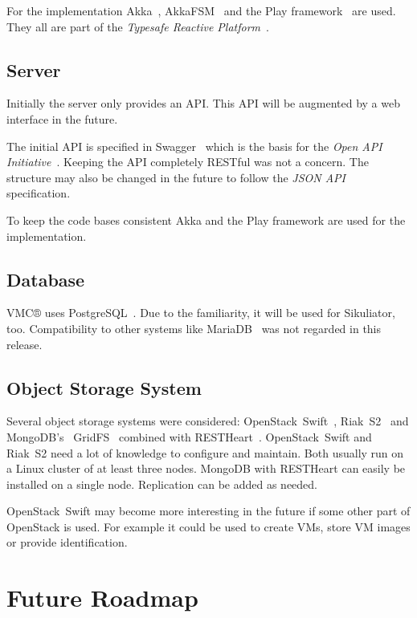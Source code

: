 \documentclass[a4paper,twocolumn]{article}
\newcommand{\VMC}[0]{VMC®}
\newcommand{\Sik}[0]{Sikuliator}
\begin{document}
For the implementation Akka~\cite{Akka}, AkkaFSM~\cite{AkkaFSM} and the Play framework~\cite{Play} are used.
They all are part of the \emph{Typesafe Reactive Platform}~\cite{TypesafeRP}.

\subsection{Server}

Initially the server only provides an API.
This API will be augmented by a web interface in the future.

The initial API is specified in Swagger~\cite{Swagger} which is the basis for the \emph{Open API Initiative}~\cite{OpenAPI}.
Keeping the API completely RESTful was not a concern.
The structure may also be changed in the future to follow the \emph{JSON API}~\cite{JSONAPI} specification.


To keep the code bases consistent Akka and the Play framework are used for the implementation.
\subsection{Database}
\VMC{} uses PostgreSQL~\cite{PostgreSQL}.
Due to the familiarity, it will be used for \Sik{}, too.
Compatibility to other systems like MariaDB~\cite{MariaDB} was not regarded in this release.

\subsection{Object Storage System}
Several object storage systems were considered: OpenStack~Swift~\cite{OpenStackSwift}, Riak~S2~\cite{RiakS2} and 
MongoDB's~\cite{MongoDB} GridFS~\cite{GridFS} combined with RESTHeart~\cite{RESTHeart}.
OpenStack~Swift and Riak~S2 need a lot of knowledge to configure and maintain.
Both usually run on a Linux cluster of at least three nodes.
MongoDB with RESTHeart can easily be installed on a single node.
Replication can be added as needed.

OpenStack~Swift may become more interesting in the future if some other part of OpenStack is used.
For example it could be used to create VMs, store VM images or provide identification.

\section{Future Roadmap}




\printbibliography[notkeyword=software,resetnumbers=true,prefixnumbers=R]
\printbibliography[keyword=used,title={Used software},resetnumbers=true,prefixnumbers=US]
\printbibliography[notkeyword=used,keyword=software,title={Other software},resetnumbers=true,prefixnumbers=OS]
\end{document}
